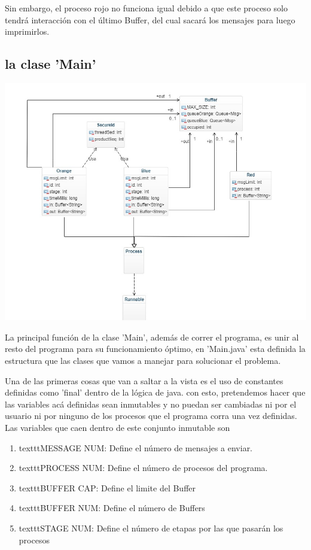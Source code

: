 \documentclass[a4paper]{article}
\begin{document}
    Sin embargo, el proceso rojo no funciona igual debido a que este proceso solo tendrá interacción con el último Buffer, del cual sacará los mensajes para luego imprimirlos. 



    \subsection{la clase 'Main'}

    \includegraphics{uml.jpeg}

    La principal función de la clase 'Main', además de correr el programa,
    es unir al resto del programa para su funcionamiento óptimo, en 'Main.java'
    esta definida la estructura que las clases que vamos a manejar para solucionar
    el problema.

    Una de las primeras cosas que van a saltar a la vista es el uso de constantes
    definidas como 'final' dentro de la lógica de java. con esto, pretendemos 
    hacer que las variables acá definidas sean inmutables y no puedan ser cambiadas
    ni por el usuario ni por ninguno de los procesos que el programa corra una vez
    definidas. Las variables que caen dentro de este conjunto inmutable son

    \begin{enumerate}
        \item texttt{MESSAGE NUM:} Define el número de mensajes a enviar.
        \item texttt{PROCESS NUM:} Define el número de procesos del programa.
        \item texttt{BUFFER CAP:} Define el limite del Buffer
        \item texttt{BUFFER NUM:} Define el número de Buffers
        \item texttt{STAGE NUM:} Define el número de etapas por las que pasarán los procesos
    \end{enumerate}
\end{document}

